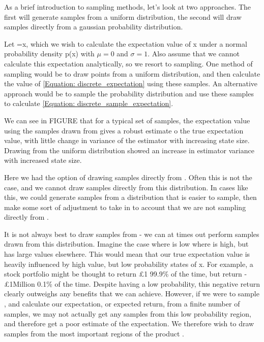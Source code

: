 As a brief introduction to sampling methods, let's look at two approaches. 
The first will generate samples from a uniform distribution, the second will draw samples directly from a gaussian probability distribution. 

Let \funcx=x, which we wish to calculate the expectation value of x under a normal probability density p(x) with $\mu=0$ and $\sigma=1$. 
Also assume that we cannot calculate this expectation analytically, so we resort to sampling. 
One method of sampling would be to draw points from a uniform distribution, and then calculate the value of \eqref{Equation: discrete_expectation} using these samples. 
An alternative approach would be to sample the probability distribution \probx and use these samples to calculate \eqref{Equation: discrete_sample_expectation}. 

We can see in FIGURE that for a typical set of samples, the expectation value using the samples drawn from \probx gives a robust estimate o the true expectation value, with little change in variance of the estimator with increasing state size. 
Drawing from the uniform distribution showed an increase in estimator variance with increased state size.

Here we had the option of drawing samples directly from \probx. 
Often this is not the case, and we cannot draw samples directly from this distribution. 
In cases like this, we could generate samples from a distribution that is easier to sample, then make some sort of adjustment to take in to account that we are not sampling directly from \probx. 

It is not always best to draw samples from \probx - we can at times out perform samples drawn from this distribution. 
Imagine the case where \funcx is low where \probx is high, but \funcx has large values elsewhere. 
This would mean that our true expectation value is heavily influenced by high value, but low probability states of x. 
For example, a stock portfolio might be thought to return \pounds 1 99.9\% of the time, but return -\pounds 1Million 0.1\% of the time. 
Despite having a low probability, this negative return clearly outweighs any benefits that we can achieve. 
However, if we were to sample \probx, and calculate our expectation, or expected return, from a finite number of samples, we may not actually get any samples from this low probability region, and therefore get a poor estimate of the expectation. 
We therefore wish to draw samples from the most important regions of the product \funcx\probx.

